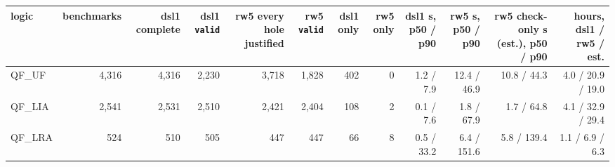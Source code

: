 \begin{tabular}{lrrrrrrrrrrr}
\toprule
logic & benchmarks & dsl1 complete & dsl1 \texttt{valid} & rw5 every hole justified & rw5 \texttt{valid} & dsl1 only & rw5 only & dsl1 s, p50 / p90 & rw5 s, p50 / p90 & rw5 check-only s (est.), p50 / p90 & hours, dsl1 / rw5 / est. \\
\midrule
QF\_UF & 4,316 & 4,316 & 2,230 & 3,718 & 1,828 & 402 & 0 & 1.2 / 7.9 & 12.4 / 46.9 & 10.8 / 44.3 & 4.0 / 20.9 / 19.0 \\
QF\_LIA & 2,541 & 2,531 & 2,510 & 2,421 & 2,404 & 108 & 2 & 0.1 / 7.6 & 1.8 / 67.9 & 1.7 / 64.8 & 4.1 / 32.9 / 29.4 \\
QF\_LRA & 524 & 510 & 505 & 447 & 447 & 66 & 8 & 0.5 / 33.2 & 6.4 / 151.6 & 5.8 / 139.4 & 1.1 / 6.9 / 6.3 \\
\bottomrule
\end{tabular}

